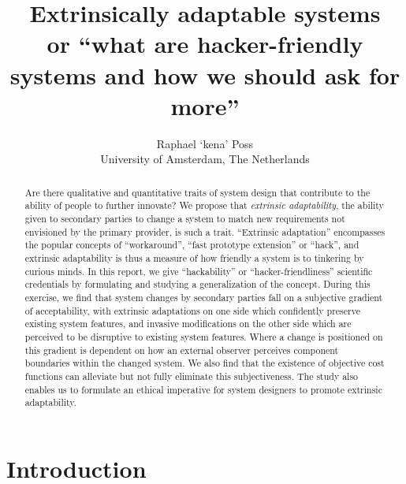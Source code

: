 \documentclass[a4paper]{article}
\begin{document}
\author{Raphael ‘kena’ Poss\\University of Amsterdam, The Netherlands}
\title{Extrinsically adaptable systems\\ \small or
  ``what are hacker-friendly systems and how we should ask for more''}

\maketitle

\begin{abstract}
  Are there qualitative and quantitative traits of system design that
  contribute to the ability of people to further innovate? We propose
  that \emph{extrinsic adaptability}, the ability given to secondary
  parties to change a system to match new requirements not envisioned
  by the primary provider, is such a trait. ``Extrinsic adaptation''
  encompasses the popular concepts of ``workaround'', ``fast prototype
  extension'' or ``hack'', and extrinsic adaptability is thus a
  measure of how friendly a system is to tinkering by curious
  minds. In this report, we give ``hackability'' or ``hacker-friendliness'' scientific
  credentials by formulating and studying a generalization of the
  concept. During this exercise, we find that system changes by
  secondary parties fall on a subjective gradient of acceptability,
  with extrinsic adaptations on one side which confidently preserve
  existing system features, and invasive modifications on the other
  side which are perceived to be disruptive to existing system
  features. Where a change is positioned on this gradient is dependent
  on how an external observer perceives component boundaries within
  the changed system. We also find that the existence of objective
  cost functions can alleviate but not fully eliminate this
  subjectiveness. The study also enables us to formulate an
  ethical imperative for system designers to promote extrinsic adaptability.
\end{abstract}

\clearpage

\setcounter{tocdepth}{1}
\tableofcontents

\clearpage

\section{Introduction}
\end{document}
